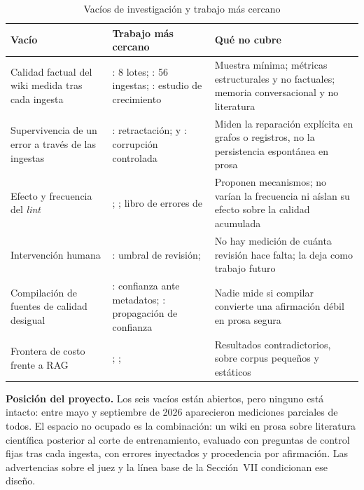 \documentclass[11pt,letterpaper]{article}
\begin{document}
\begin{table}[!ht]
\caption{Vacíos de investigación y trabajo más cercano}\label{tab:vacios}
\small
\begin{tabular}{L{4.2cm}L{5.3cm}L{5.3cm}}
\toprule
Vacío & Trabajo más cercano & Qué no cubre \\
\midrule
Calidad factual del wiki medida tras cada ingesta & \citet{zhang2026pilot}: 8 lotes; \citet{ran2026}: 56 ingestas; \citet{zhou2026}: estudio de crecimiento & Muestra mínima; métricas estructurales y no factuales; memoria conversacional y no literatura \\
Supervivencia de un error a través de las ingestas & \citet{zhang2026prov}: retractación; \citet{yu2026} y \citet{mishra2026}: corrupción controlada & Miden la reparación explícita en grafos o registros, no la persistencia espontánea en prosa \\
Efecto y frecuencia del \emph{lint} & \citet{huang2026deeprefine}; \citet{huerta2026wicer}; libro de errores de \citet{ming2026llmwiki} & Proponen mecanismos; no varían la frecuencia ni aíslan su efecto sobre la calidad acumulada \\
Intervención humana & \citet{zhang2026prov}: umbral de revisión; \citet{jiang2024} & No hay medición de cuánta revisión hace falta; \citet{zhang2026pilot} la deja como trabajo futuro \\
Compilación de fuentes de calidad desigual & \citet{hu2026trust}: confianza ante metadatos; \citet{zhang2026prov}: propagación de confianza & Nadie mide si compilar convierte una afirmación débil en prosa segura \\
Frontera de costo frente a RAG & \citet{wen2026}; \citet{cochran2026rag}; \citet{cochran2026progressive} & Resultados contradictorios, sobre corpus pequeños y estáticos \\
\bottomrule
\end{tabular}
\end{table}

\textbf{Posición del proyecto.} Los seis vacíos están abiertos, pero ninguno está intacto: entre mayo y septiembre de 2026 aparecieron mediciones parciales de todos. El espacio no ocupado es la combinación: un wiki en prosa sobre literatura científica posterior al corte de entrenamiento, evaluado con preguntas de control fijas tras cada ingesta, con errores inyectados y procedencia por afirmación. Las advertencias sobre el juez y la línea base de la Sección~VII condicionan ese diseño.
\end{document}
